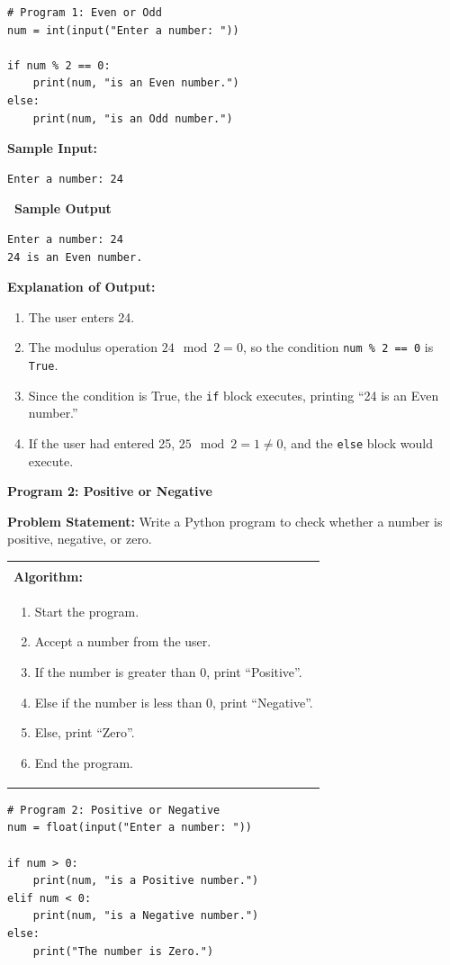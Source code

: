 \documentclass[12pt,a4paper]{article}
\makeatletter
\newcommand{\outhead}{\noindent\colorbox{cmrgreen!25}%
  {\textbf{\small\color{cmrdark}~Sample Output~}}\par\vspace{-1pt}}
\newenvironment{algobox}{%
  \par\vspace{4pt}%
  \noindent\begin{tabular}{@{}p{\linewidth}@{}}%
  \hline\\[-8pt]%
  \textbf{\color{blue!60!black}\small Algorithm:}\\[2pt]%
}{%
  \\[-4pt]\hline%
  \end{tabular}\par\vspace{4pt}%
}
\makeatother
\begin{document}
\begin{lstlisting}
# Program 1: Even or Odd
num = int(input("Enter a number: "))

if num % 2 == 0:
    print(num, "is an Even number.")
else:
    print(num, "is an Odd number.")
\end{lstlisting}

\textbf{Sample Input:}
\begin{verbatim}
Enter a number: 24
\end{verbatim}

\outhead
\begin{lstlisting}[style=outputstyle]
Enter a number: 24
24 is an Even number.
\end{lstlisting}

\textbf{Explanation of Output:}
\begin{enumerate}
  \item The user enters 24.
  \item The modulus operation $24 \mod 2 = 0$, so the condition \texttt{num \% 2 == 0} is \texttt{True}.
  \item Since the condition is True, the \texttt{if} block executes, printing ``24 is an Even number.''
  \item If the user had entered 25, $25 \mod 2 = 1 \neq 0$, and the \texttt{else} block would execute.
\end{enumerate}

\vspace{0.5cm}

\textbf{Program 2: Positive or Negative}

\textbf{Problem Statement:}
Write a Python program to check whether a number is positive, negative, or zero.

\begin{algobox}
\begin{enumerate}[label=Step \arabic*:]
  \item Start the program.
  \item Accept a number from the user.
  \item If the number is greater than 0, print ``Positive''.
  \item Else if the number is less than 0, print ``Negative''.
  \item Else, print ``Zero''.
  \item End the program.
\end{enumerate}
\end{algobox}

\begin{lstlisting}
# Program 2: Positive or Negative
num = float(input("Enter a number: "))

if num > 0:
    print(num, "is a Positive number.")
elif num < 0:
    print(num, "is a Negative number.")
else:
    print("The number is Zero.")
\end{lstlisting}
\end{document}
